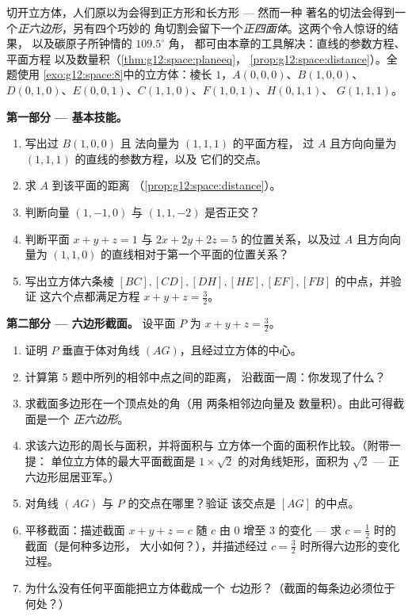 \begin{problem}
\label{pb:g12:space:1}
切开立方体，人们原以为会得到正方形和长方形 --- 然而一种
著名的切法会得到一个\emph{正六边形}，另有四个巧妙的
角切割会留下一个\emph{正四面体}。这两个令人惊讶的结果，
以及碳原子所钟情的 $109.5^\circ$ 角，
都可由本章的工具解决：直线的参数方程、平面方程
以及数量积（\cref{thm:g12:space:planeeq}，
\cref{prop:g12:space:distance}）。全题使用
\cref{exo:g12:space:8}中的立方体：棱长 $1$，$A(0,0,0)$、$B(1,0,0)$、
$D(0,1,0)$、$E(0,0,1)$、$C(1,1,0)$、$F(1,0,1)$、$H(0,1,1)$、
$G(1,1,1)$。

\medskip
\noindent\textbf{第一部分 --- 基本技能。}
\begin{enumerate}
  \item 写出过 $B(1,0,0)$ 且
        法向量为 $(1,1,1)$ 的平面方程，
        过 $A$ 且方向向量为 $(1,1,1)$ 的直线的参数方程，以及
        它们的交点。
  \item 求 $A$ 到该平面的距离
        （\cref{prop:g12:space:distance}）。
  \item 判断向量 $(1,-1,0)$ 与 $(1,1,-2)$ 是否正交？
  \item 判断平面 $x + y + z = 1$ 与
        $2x + 2y + 2z = 5$ 的位置关系，以及过 $A$ 且方向向量为
        $(1,1,0)$ 的直线相对于第一个平面的位置关系？
  \item 写出立方体六条棱
        $[BC], [CD], [DH], [HE], [EF], [FB]$ 的中点，并验证
        这六个点都满足方程
        $x + y + z = \frac32$。
\end{enumerate}

\medskip
\noindent\textbf{第二部分 --- 六边形截面。}
设平面 $P$ 为 $x + y + z = \frac32$。
\begin{enumerate}[resume]
  \item 证明 $P$ 垂直于体对角线
        $(AG)$，且经过立方体的中心。
  \item 计算第 5 题中所列的相邻中点之间的距离，
        沿截面一周：你发现了什么？
  \item 求截面多边形在一个顶点处的角（用
        两条相邻边向量及
        数量积）。由此可得截面是一个
        \emph{正六边形}。
  \item 求该六边形的周长与面积，并将面积与
        立方体一个面的面积作比较。（附带一提：
        单位立方体的最大平面截面是
        $1 \times \sqrt2$ 的对角线矩形，面积为
        $\sqrt2$ --- 正六边形屈居亚军。）
  \item 对角线 $(AG)$ 与 $P$ 的交点在哪里？验证
        该交点是 $[AG]$ 的中点。
  \item 平移截面：描述截面
        $x + y + z = c$ 随 $c$ 由 $0$ 增至 $3$ 的变化 ---
        求 $c = \frac12$ 时的截面（是何种多边形，
        大小如何？），并描述经过
        $c = \frac32$ 时所得六边形的变化过程。
  \item 为什么没有任何平面能把立方体截成一个
        \emph{七}边形？（截面的每条边必须位于
        何处？）
\end{enumerate}


\end{problem}
